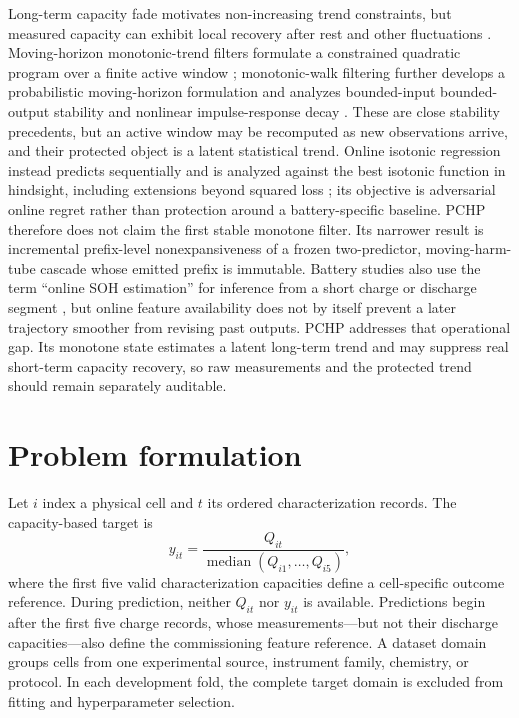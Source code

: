 \documentclass[11pt]{article}
\begin{document}
Long-term capacity fade motivates non-increasing trend constraints, but measured capacity can exhibit local recovery after rest and other fluctuations \citep{ma2021regeneration}. Moving-horizon monotonic-trend filters formulate a constrained quadratic program over a finite active window \citep{samar2004moving}; monotonic-walk filtering further develops a probabilistic moving-horizon formulation and analyzes bounded-input bounded-output stability and nonlinear impulse-response decay \citep{gorinevsky2008efficient}. These are close stability precedents, but an active window may be recomputed as new observations arrive, and their protected object is a latent statistical trend. Online isotonic regression instead predicts sequentially and is analyzed against the best isotonic function in hindsight, including extensions beyond squared loss \citep{kotlowski2016online}; its objective is adversarial online regret rather than protection around a battery-specific baseline. PCHP therefore does not claim the first stable monotone filter. Its narrower result is incremental prefix-level nonexpansiveness of a frozen two-predictor, moving-harm-tube cascade whose emitted prefix is immutable. Battery studies also use the term ``online SOH estimation'' for inference from a short charge or discharge segment \citep{liu2020online}, but online feature availability does not by itself prevent a later trajectory smoother from revising past outputs. PCHP addresses that operational gap. Its monotone state estimates a latent long-term trend and may suppress real short-term capacity recovery, so raw measurements and the protected trend should remain separately auditable.

\section{Problem formulation}

Let $i$ index a physical cell and $t$ its ordered characterization records. The capacity-based target is
\begin{equation}
  y_{it}=\frac{Q_{it}}{\operatorname{median}(Q_{i1},\ldots,Q_{i5})},
  \label{eq:soh}
\end{equation}
where the first five valid characterization capacities define a cell-specific outcome reference. During prediction, neither $Q_{it}$ nor $y_{it}$ is available. Predictions begin after the first five charge records, whose measurements---but not their discharge capacities---also define the commissioning feature reference. A dataset domain groups cells from one experimental source, instrument family, chemistry, or protocol. In each development fold, the complete target domain is excluded from fitting and hyperparameter selection.
\end{document}
